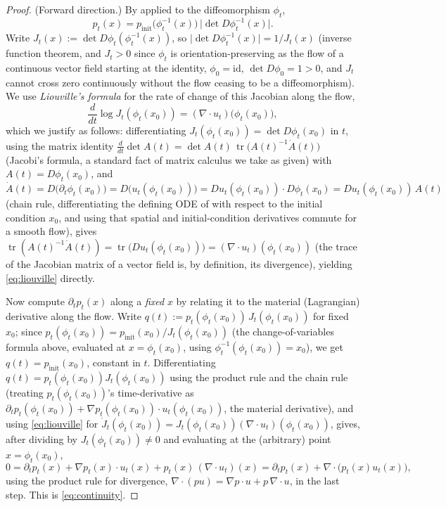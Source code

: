 \documentclass[11pt,a4paper]{report}
\theoremstyle{definition}
\theoremstyle{remark}
\DeclareMathOperator{\tr}{tr}
\begin{document}
\begin{proof}
(Forward direction.) By  applied to the
diffeomorphism $\phi_t$,
\[
p_t(x) = p_{\mathrm{init}}\bigl(\phi_t^{-1}(x)\bigr)\,\bigl|\det D\phi_t^{-1}(x)\bigr| .
\]
Write $J_t(x) := \det D\phi_t(\phi_t^{-1}(x))$, so
$\bigl|\det D\phi_t^{-1}(x)\bigr| = 1/J_t(x)$ (inverse function theorem, and
$J_t>0$ since $\phi_t$ is orientation-preserving as the flow of a
continuous vector field starting at the identity, $\phi_0=\mathrm{id}$,
$\det D\phi_0=1>0$, and $J_t$ cannot cross zero continuously without the
flow ceasing to be a diffeomorphism). We use \emph{Liouville's formula} for
the rate of change of this Jacobian along the flow,
\begin{equation}
\label{eq:liouville}
\frac{d}{dt}\log J_t(\phi_t(x_0)) = (\nabla\cdot u_t)\bigl(\phi_t(x_0)\bigr) ,
\end{equation}
which we justify as follows: differentiating $J_t(\phi_t(x_0))=\det D\phi_t(x_0)$
in $t$, using the matrix identity $\frac{d}{dt}\det A(t)=\det A(t)\,\tr\bigl(A(t)^{-1}\dot A(t)\bigr)$
(Jacobi's formula, a standard fact of matrix calculus we take as given)
with $A(t)=D\phi_t(x_0)$, and $\dot A(t) = D\bigl(\partial_t\phi_t(x_0)\bigr) = D\bigl(u_t(\phi_t(x_0))\bigr) = Du_t(\phi_t(x_0))\cdot D\phi_t(x_0) = Du_t(\phi_t(x_0))\,A(t)$
(chain rule, differentiating the defining ODE of 
with respect to the initial condition $x_0$, and using that spatial and
initial-condition derivatives commute for a smooth flow), gives
$\tr(A(t)^{-1}\dot A(t)) = \tr\bigl(Du_t(\phi_t(x_0))\bigr) = (\nabla\cdot u_t)(\phi_t(x_0))$
(the trace of the Jacobian matrix of a vector field is, by definition, its
divergence), yielding \eqref{eq:liouville} directly.

Now compute $\partial_tp_t(x)$ along a \emph{fixed} $x$ by relating it to
the material (Lagrangian) derivative along the flow. Write
$q(t) := p_t(\phi_t(x_0))\,J_t(\phi_t(x_0))$ for fixed $x_0$; since
$p_t(\phi_t(x_0)) = p_{\mathrm{init}}(x_0)/J_t(\phi_t(x_0))$
(the change-of-variables formula above, evaluated at $x=\phi_t(x_0)$, using
$\phi_t^{-1}(\phi_t(x_0))=x_0$), we get $q(t)=p_{\mathrm{init}}(x_0)$,
constant in $t$. Differentiating $q(t)=p_t(\phi_t(x_0))J_t(\phi_t(x_0))$
using the product rule and the chain rule (treating $p_t(\phi_t(x_0))$'s
time-derivative as $\partial_tp_t(\phi_t(x_0)) + \nabla p_t(\phi_t(x_0))\cdot u_t(\phi_t(x_0))$,
the material derivative), and using \eqref{eq:liouville} for
$\dot J_t(\phi_t(x_0))=J_t(\phi_t(x_0))(\nabla\cdot u_t)(\phi_t(x_0))$, gives,
after dividing by $J_t(\phi_t(x_0))\ne0$ and evaluating at the (arbitrary)
point $x=\phi_t(x_0)$,
\[
0 = \partial_tp_t(x) + \nabla p_t(x)\cdot u_t(x) + p_t(x)\,(\nabla\cdot u_t)(x)
= \partial_tp_t(x) + \nabla\cdot\bigl(p_t(x)u_t(x)\bigr) ,
\]
using the product rule for divergence,
$\nabla\cdot(pu)=\nabla p\cdot u+p\,\nabla\cdot u$, in the last step. This is
\eqref{eq:continuity}.


\end{proof}
\end{document}
